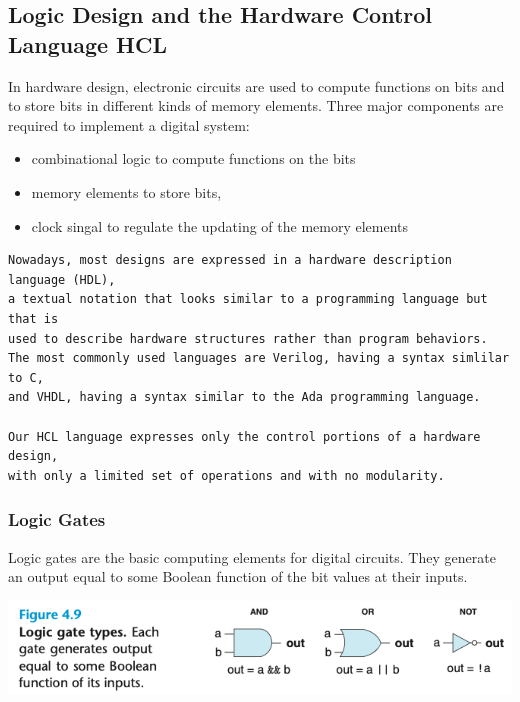 \documentclass[11pt]{article}
\begin{document}
\subsection{Logic Design and the Hardware Control Language HCL}
\label{sec:org6ffd47a}
In hardware design, electronic circuits are used to compute functions on bits and to store bits in different kinds of memory elements. Three major components are required to implement a digital system:\\
\begin{itemize}
\item combinational logic to compute functions on the bits\\
\item memory elements to store bits,\\
\item clock singal to regulate the updating of the memory elements\\
\end{itemize}

\begin{verbatim}
Nowadays, most designs are expressed in a hardware description language (HDL),
a textual notation that looks similar to a programming language but that is 
used to describe hardware structures rather than program behaviors.
The most commonly used languages are Verilog, having a syntax simlilar to C,
and VHDL, having a syntax similar to the Ada programming language.

Our HCL language expresses only the control portions of a hardware design,
with only a limited set of operations and with no modularity.
\end{verbatim}

\subsubsection{Logic Gates}
\label{sec:org00616b6}
Logic gates are the basic computing elements for digital circuits. They generate an output equal to some Boolean function of the bit values at their inputs.\\

\begin{center}
\includegraphics[width=.9\linewidth]{pics/figure4.9-logic-gate-types.png}
\end{center}
\end{document}
